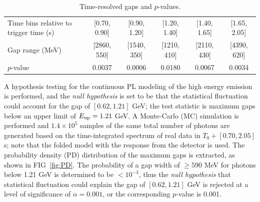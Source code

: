 \documentclass[prd,twocolumn,amsmath,amssymb,aps]{revtex4-2} %
\begin{document}
\begin{table} 
\centering
\caption{Time-resolved gaps and $p$-values.\label{tab:gapprob}}
\begin{ruledtabular}
\begin{tabular}{lccccc}
Time bins relative to trigger time (s)
&[0.70, 0.90]
&[0.90, 1.20]
&[1.20, 1.40]
&[1.40, 1.65]
&[1.65, 2.05]
\\
Gap range (MeV) 
&[2860, 550]
&[1540, 350]
&[1210, 410]
&[2110, 430]
&[4390, 620]
\\
 $p$-value &0.0037 &0.0006 &0.0180 &0.0067 &0.0034 \\
\end{tabular}
\end{ruledtabular}
\end{table}

A hypothesis testing for the continuous PL modeling of the high energy emission is performed, and the \textit{null hypothesis} is set to be that the statistical fluctuation could account for the gap of $[0.62,1.21]$ GeV; the test statistic is maximum gaps below an upper limit of $E_{\rm up}=1.21$ GeV.
A Monte-Carlo (MC) simulation is performed and $1.4\times10^5$ samples of the same total number of photons are generated based on the time-integrated spectrum of real data in $T_0+[0.70,2.05]$ s; note that the folded model with the response from the detector is used. The probability density (PD) distribution of the maximum gaps is extracted, as shown in FIG~\ref{fig:PD}. The probability of a gap width of $\geq590$ MeV for photons below 1.21 GeV is determined to be $<10^{-3}$, thus the \textit{ null hypothesis} that statistical fluctuation could explain the gap of $[0.62,1.21]$ GeV is rejected at a level of significance of $\alpha=0.001$, or the corresponding $p$-value is 0.001. 
\end{document}
